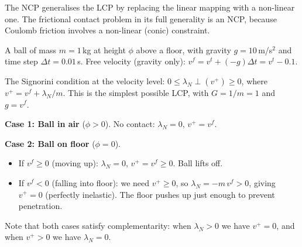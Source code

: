 \documentclass[11pt,twoside]{report}
\theoremstyle{definition}
\theoremstyle{plain}
\theoremstyle{remark}
\newcommand{\x}{\bm{x}}
\newcommand{\0}{\bm{0}}
\begin{document}
\begin{definitionbox}
The NCP generalises the LCP by replacing the linear mapping with a
non-linear one.  The frictional contact problem in its full generality
is an NCP, because Coulomb friction involves a non-linear (conic)
constraint.
\end{definitionbox}

\begin{examplebox}
A ball of mass $m=1$\,kg at height $\phi$ above a floor, with gravity $g=10$\,m/s$^{2}$ and time step $\Delta t=0.01$\,s.
Free velocity (gravity only): $v^{f}=v^{t}+(-g)\Delta t=v^{t}-0.1$.

The Signorini condition at the velocity level:
$0\le\lambda_{N}\perp(v^{+})\ge 0$,
where $v^{+}=v^{f}+\lambda_{N}/m$.
This is the simplest possible LCP, with $G=1/m=1$ and $g=v^{f}$.

\textbf{Case 1: Ball in air} ($\phi>0$). No contact: $\lambda_{N}=0$, $v^{+}=v^{f}$.

\textbf{Case 2: Ball on floor} ($\phi=0$).
\begin{itemize}
\item If $v^{f}\ge 0$ (moving up): $\lambda_{N}=0$, $v^{+}=v^{f}\ge 0$.
      Ball lifts off. \checkmark
\item If $v^{f}<0$ (falling into floor): we need $v^{+}\ge 0$, so
      $\lambda_{N}=-m\,v^{f}>0$, giving $v^{+}=0$ (perfectly inelastic).
      The floor pushes up just enough to prevent penetration. \checkmark
\end{itemize}

Note that both cases satisfy complementarity: when $\lambda_{N}>0$ we have $v^{+}=0$, and when $v^{+}>0$ we have $\lambda_{N}=0$.
\end{examplebox}

\begin{center}
\end{center}
\end{document}
